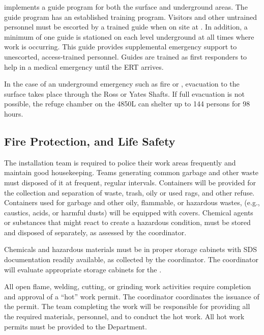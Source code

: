  implements a guide program for both the surface and
underground areas. The guide program has an established training
program.  Visitors and other untrained personnel must be escorted by a trained
guide when on site at . %
In addition, a minimum of one guide is stationed on each %
level underground at all times where work is occurring. This guide provides
supplemental emergency support to unescorted, access-trained
personnel. Guides are trained as first responders to help in a medical
emergency until the ERT arrives. 

In the case of an underground emergency such as fire or ,
evacuation to the surface takes place through the Ross or Yates Shafts.
If full evacuation is not  possible, the refuge chamber on the 4850L
 can shelter up to 144 persons for 98 hours.

\subsection{Fire Protection,  and Life Safety}

The  installation team is required to police their work areas
frequently and maintain good housekeeping. Teams generating common garbage and other
waste must disposed of it at frequent, regular intervals. %
Containers will be provided for the
collection and separation of waste, trash, oily or used rags, and other
refuse.  Containers used for garbage and other oily, flammable, or
hazardous wastes, (e.g., caustics, acids, or harmful dusts) will be equipped with covers.  Chemical agents or
substances that might react to create a hazardous condition, must
be stored and disposed of separately, as assessed by the
  coordinator.

Chemicals and hazardous materials must be in proper storage cabinets
with SDS documentation readily available,  as collected by the
  coordinator.  The
  coordinator will evaluate
appropriate storage cabinets for the . 


All open flame, welding, cutting, or grinding work activities require completion and approval of a  ``hot'' work permit.  The 
 coordinator coordinates the issuance of the permit.
The team completing the work will be responsible for
providing all the required materials, personnel, and  %
to conduct the hot work. All hot work permits must be
provided to the   Department.

